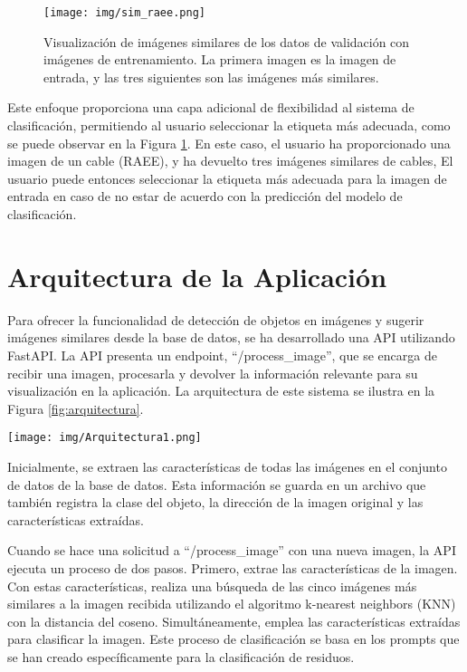 \documentclass[10pt,a4paper,twocolumn,twoside]{article}
\begin{document}
\begin{figure}[h]
  \centering
  \texttt{[image: img/sim\_raee.png]}
  \caption{Visualización de imágenes similares de los datos de validación con imágenes de entrenamiento. La primera imagen es la imagen de entrada, y las tres siguientes son las imágenes más similares.}
  \label{fig:sim_raee}
\end{figure}

Este enfoque proporciona una capa adicional de flexibilidad al sistema de clasificación, permitiendo al usuario seleccionar la etiqueta más adecuada, como se puede observar en la Figura \ref{fig:sim_raee}. En este caso, el usuario ha proporcionado una imagen de un cable (RAEE), y ha devuelto tres imágenes similares de cables, El usuario puede entonces seleccionar la etiqueta más adecuada para la imagen de entrada en caso de no estar de acuerdo con la predicción del modelo de clasificación.

\section{Arquitectura de la Aplicación}

Para ofrecer la funcionalidad de detección de objetos en imágenes y sugerir imágenes similares desde la base de datos, se ha desarrollado una API utilizando FastAPI. La API presenta un endpoint, ``/process\_image'', que se encarga de recibir una imagen, procesarla y devolver la información relevante para su visualización en la aplicación. La arquitectura de este sistema se ilustra en la Figura \ref{fig:arquitectura}.

\begin{figure*}[h]
\centering
\texttt{[image: img/Arquitectura1.png]}
\caption{Arquitectura del despliegue del modelo de clasificación OpenCLIP para la clasificación de residuos.}
\label{fig:arquitectura}
\end{figure*}

Inicialmente, se extraen las características de todas las imágenes en el conjunto de datos de la base de datos. Esta información se guarda en un archivo que también registra la clase del objeto, la dirección de la imagen original y las características extraídas.

Cuando se hace una solicitud a ``/process\_image'' con una nueva imagen, la API ejecuta un proceso de dos pasos. Primero, extrae las características de la imagen. Con estas características, realiza una búsqueda de las cinco imágenes más similares a la imagen recibida utilizando el algoritmo k-nearest neighbors (KNN) con la distancia del coseno. Simultáneamente, emplea las características extraídas para clasificar la imagen. Este proceso de clasificación se basa en los prompts que se han creado específicamente para la clasificación de residuos.
\end{document}
